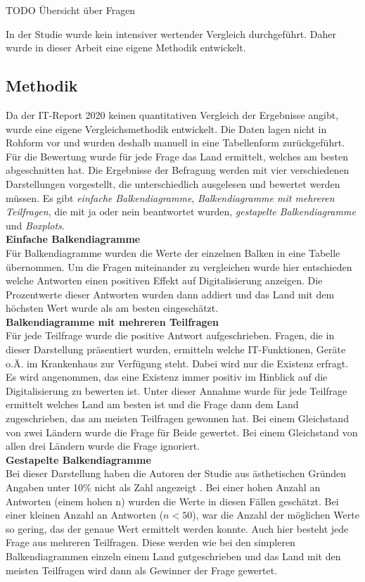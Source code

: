 TODO Übersicht über Fragen

In der Studie wurde kein intensiver wertender Vergleich durchgeführt. Daher wurde in dieser Arbeit eine eigene Methodik entwickelt.
\subsection{Methodik}
	Da der IT-Report 2020 keinen quantitativen Vergleich der Ergebnisse angibt, wurde eine eigene Vergleichsmethodik entwickelt. Die Daten lagen nicht in Rohform vor und wurden deshalb manuell in eine Tabellenform zurückgeführt. Für die Bewertung wurde für jede Frage das Land ermittelt, welches am besten abgeschnitten hat. Die Ergebnisse der Befragung werden mit vier verschiedenen Darstellungen vorgestellt, die unterschiedlich ausgelesen und bewertet werden müssen. Es gibt \textit{einfache Balkendiagramme}, \textit{Balkendiagramme mit mehreren Teilfragen}, die mit ja oder nein beantwortet wurden, \textit{gestapelte Balkendiagramme} und \textit{Boxplots}.
	\vspace{\parheadvspace}\\
	\textbf{Einfache Balkendiagramme}\\
	Für Balkendiagramme wurden die Werte der einzelnen Balken in eine Tabelle übernommen. Um die Fragen miteinander zu vergleichen wurde hier entschieden welche Antworten einen positiven Effekt auf Digitalisierung anzeigen. Die Prozentwerte dieser Antworten wurden dann addiert und das Land mit dem höchsten Wert wurde als am besten eingeschätzt.
	\vspace{\parheadvspace}\\
	\textbf{Balkendiagramme mit mehreren Teilfragen}\\
	Für jede Teilfrage wurde die positive Antwort aufgeschrieben.	Fragen, die in dieser Darstellung präsentiert wurden, ermitteln welche IT-Funktionen, Geräte o.Ä. im Krankenhaus zur Verfügung steht. Dabei wird nur die Existenz erfragt. Es wird angenommen, das eine Existenz immer positiv im Hinblick auf die Digitalisierung zu bewerten ist. Unter dieser Annahme wurde für jede Teilfrage ermittelt welches Land am besten ist und die Frage dann dem Land zugeschrieben, das am meisten Teilfragen gewonnen hat. Bei einem Gleichstand von zwei Ländern wurde die Frage für Beide gewertet. Bei einem Gleichstand von allen drei Ländern wurde die Frage ignoriert.
	\vspace{\parheadvspace}\\
	\textbf{Gestapelte Balkendiagramme}\\
	Bei dieser Darstellung haben die Autoren der Studie aus ästhetischen Gründen Angaben unter 10\% nicht als Zahl angezeigt \parencite[298]{huebner2020}. Bei einer hohen Anzahl an Antworten (einem hohen n) wurden die Werte in diesen Fällen geschätzt. Bei einer kleinen Anzahl an Antworten ($n<50$), war die Anzahl der möglichen Werte so gering, das der genaue Wert ermittelt werden konnte. Auch hier besteht jede Frage aus mehreren Teilfragen. Diese werden wie bei den simpleren Balkendiagrammen einzeln einem Land gutgeschrieben und das Land mit den meisten Teilfragen wird dann als Gewinner der Frage gewertet.

